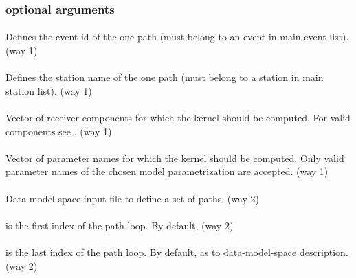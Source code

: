 \subsubsection{optional arguments}
\paragraph{ } 
Defines the event id of the one path (must belong to an event in main event list). (way 1)
\paragraph{ }
Defines the station name of the one path (must belong to a station in main station list). (way 1)
\paragraph{ }
Vector of receiver components for which the kernel should be computed. For valid components see . (way 1)
\paragraph{ }
Vector of parameter names for which the kernel should be computed. Only valid parameter names of the chosen model parametrization are accepted. (way 1)
\paragraph{ }
Data model space input file to define a set of paths. (way 2)
\paragraph{ }
 is the first index of the path loop. By default,  (way 2)
\paragraph{ }
 is the last index of the path loop. By default,  as to data-model-space description. (way 2)
